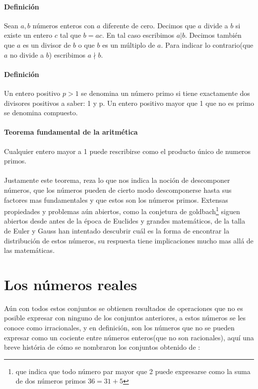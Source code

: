\documentclass{article}
\begin{document}
\paragraph{Definición} Sean $a,b$ números enteros con $a$ diferente de cero. Decimos que $a$ divide a $b$ si existe un entero $c$ tal que $b=ac$. En tal caso escribimos $a|b$. Decimos también que $a$ es un divisor de $b$ o que $b$ es un múltiplo de $a$. Para indicar lo contrario(que $a$ no divide a $b$) escribimos $a \nmid b$.

\paragraph{Definición} Un entero positivo $p > 1$ se denomina un número primo si tiene exactamente dos divisores positivos a saber: 1 y p. Un entero positivo mayor que 1 que no es primo se denomina compuesto.

\paragraph{Teorema fundamental de la aritmética} Cualquier entero mayor a 1 puede rescribirse como el producto único de numeros primos.

\paragraph{}
Justamente este teorema, reza lo que nos indica la noción de descomponer números, que los números pueden de cierto modo descomponerse hasta sus factores mas fundamentales y que estos son los números primos. Extensas propiedades y problemas aún abiertos, como la conjetura de goldbach\footnote{que indica que todo número par mayor que 2 puede expresarse como la suma de dos números primos $36 = 31 + 5$} siguen abiertos desde antes de la época de Euclides y grandes matemáticos, de la talla de Euler y Gauss han intentado descubrir cuál es la forma de encontrar la distribución de estos números, su respuesta tiene implicaciones mucho mas allá de las matemáticas.

\section{Los números reales}

Aún con todos estos conjuntos se obtienen resultados de operaciones que no es posible expresar con ninguno de los conjuntos anteriores, a estos números se les conoce como irracionales, y en definición, son los números que no se pueden expresar como un cociente entre números enteros(que no son racionales), aquí una breve história de cómo se nombraron los conjuntos obtenido de \cite{patino_duque_1977}:
\end{document}
